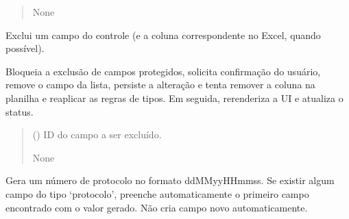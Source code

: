 \documentclass[letterpaper,10pt,english]{sphinxmanual}
\begin{document}
\begin{fulllineitems}
\begin{fulllineitems}
\begin{quote}
\begin{description}
\sphinxAtStartPar
{}

\sphinxAtStartPar
None

\end{description}\end{quote}

\end{fulllineitems}


\begin{fulllineitems}
\label{\detokenize{api/app:app.App.delete_field}}
\pysigstartsignatures
\pysiglinewithargsret
{}
{}
{}
\pysigstopsignatures
\sphinxAtStartPar
Exclui um campo do controle (e a coluna correspondente no Excel, quando possível).

\sphinxAtStartPar
Bloqueia a exclusão de campos protegidos, solicita confirmação do usuário,
remove o campo da lista, persiste a alteração e tenta remover a coluna na
planilha e reaplicar as regras de tipos. Em seguida, re\sphinxhyphen{}renderiza a UI e
atualiza o status.
\begin{quote}\begin{description}
\sphinxAtStartPar
{} () \textendash{} ID do campo a ser excluído.

\sphinxAtStartPar
{}

\sphinxAtStartPar
None

\end{description}\end{quote}

\end{fulllineitems}


\begin{fulllineitems}
\label{\detokenize{api/app:app.App.generate_protocol}}
\pysigstartsignatures
\pysiglinewithargsret
{}
{}
{}
\pysigstopsignatures
\sphinxAtStartPar
Gera um número de protocolo no formato ddMMyyHHmmss.
Se existir algum campo do tipo ‘protocolo’, preenche automaticamente
o primeiro campo encontrado com o valor gerado.
Não cria campo novo automaticamente.
\begin{quote}\begin{description}
\sphinxAtStartPar
{}


\end{description}
\end{quote}
\end{fulllineitems}
\end{fulllineitems}
\end{document}
